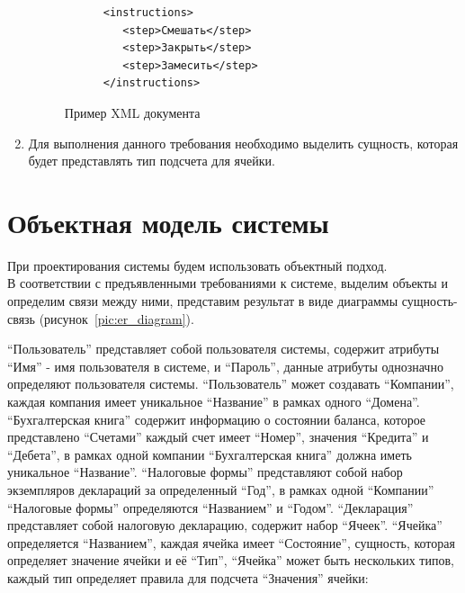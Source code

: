 \documentclass[14pt,a4paper]{reportmod}
\begin{document}
\begin{enumerate}
\begin{figure}
\begin{small}
\begin{verbatim}
      <instructions>
         <step>Смешать</step>
         <step>Закрыть</step>
         <step>Замесить</step>
      </instructions>
    \end{verbatim}
  \end{small}
  \caption{Пример XML документа}
  \label{pic:xml_sample}
\end{figure}
  \item Для выполнения данного требования необходимо выделить сущность, которая будет представлять тип подсчета для ячейки.
\end{enumerate}

\section{Объектная модель системы}
При проектирования системы будем использовать объектный подход.\\
В соответствии с предъявленными требованиями к системе, выделим объекты и определим связи между ними, представим результат в виде диаграммы сущность-связь (рисунок~\ref{pic:er_diagram}).

``Пользователь'' представляет собой пользователя системы, содержит атрибуты ``Имя'' - имя пользователя в системе, и ``Пароль'',  данные атрибуты однозначно определяют пользователя системы. ``Пользователь'' может создавать ``Компании'', каждая компания имеет уникальное ``Название'' в рамках одного ``Домена''. ``Бухгалтерская книга'' содержит информацию о состоянии баланса, которое представлено ``Счетами'' каждый счет имеет ``Номер'', значения ``Кредита'' и ``Дебета'', в рамках одной компании ``Бухгалтерская книга'' должна иметь уникальное ``Название''. ``Налоговые формы'' представляют собой набор экземпляров деклараций за определенный ``Год'', в рамках одной ``Компании'' ``Налоговые формы'' определяются ``Названием'' и ``Годом''. ``Декларация'' представляет собой налоговую декларацию, содержит набор ``Ячеек''. ``Ячейка'' определяется ``Названием'', каждая ячейка имеет ``Состояние'', сущность, которая определяет значение ячейки и её ``Тип'', ``Ячейка'' может быть нескольких типов, каждый тип определяет правила для подсчета ``Значения'' ячейки:
\end{document}
